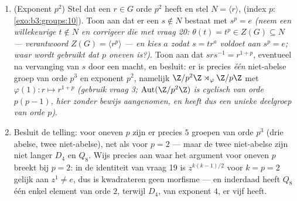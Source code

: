 \begin{problem}
\begin{enumerate}[resume]
        $(I + N)^p$ voor strikt bovendriehoekse $N$, met $N^3 = 0$
        en $p \geq 3$): elke niet-abelse groep van orde $p^3$ en
        exponent $p$ is isomorf met $H_p$.
  \item (Exponent $p^2$) Stel dat een $r \in G$ orde $p^2$ heeft en
        stel $N = \langle r\rangle$,  (index $p$:
        \cref{exo:b3:groups:10}). Toon aan dat er een $s \notin N$
        bestaat met $s^p = e$ \emph{(neem een willekeurige $t
        \notin N$ en corrigeer die met vraag 20: $\theta(t) = t^p
        \in Z(G) \subseteq N$ --- verantwoord $Z(G) = \langle
        r^p\rangle$ --- en kies $a$ zodat $s = tr^{a}$ voldoet aan
        $s^p = e$; waar wordt gebruikt dat $p$ oneven is?)}. Toon
        aan dat $srs^{-1} = r^{1+p}$, eventueel na vervanging van
        $s$ door een macht, en besluit: er is precies \emph{één}
        niet-abelse groep van orde $p^3$ en exponent $p^2$, namelijk
        $\Z/p^2\Z \rtimes_\varphi \Z/p\Z$ met $\varphi(1)\colon r
        \mapsto r^{1+p}$ \emph{(gebruik vraag 3;
        $\operatorname{Aut}(\Z/p^2\Z)$ is cyclisch van orde
        $p(p-1)$, hier zonder bewijs aangenomen, en heeft dus een
        unieke deelgroep van orde $p$)}.
  \item Besluit de telling: voor oneven $p$ zijn er precies $5$
        groepen van orde $p^3$ (drie abelse, twee niet-abelse),
        net als voor $p = 2$ --- maar de twee niet-abelse zijn niet
        langer $D_4$ en $Q_8$. Wijs precies aan waar het
        argument voor oneven $p$ breekt bij $p = 2$: in de
        identiteit van vraag 19 is $z^{k(k-1)/2}$ voor $k = p = 2$
        gelijk aan $z^1 \neq e$, dus is kwadrateren geen morfisme
        --- en inderdaad heeft $Q_8$ één enkel element van orde
        $2$, terwijl $D_4$, van exponent $4$, er vijf heeft.
\end{enumerate}


\end{problem}
